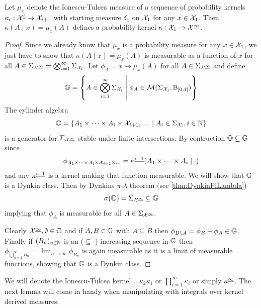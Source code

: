 \begin{prop}
  Let $\mu_x$ denote the Ionescu-Tulcea measure of a
  sequence of probability kernels
  $\kappa_i : \mathcal{X}^{\underline{i}} \to \mathcal{X}_{i+1}$
  with starting measure $\delta_x$ on $\mathcal{X}_1$ for any $x \in \mathcal{X}_1$.
  Then $\kappa(A \mid x) = \mu_x(A)$ defines a probability kernel
  $\kappa : \mathcal{X}_1 \to \mathcal{X}^{\underline{\infty}}$.
\end{prop}
\begin{proof}
  Since we already know that $\mu_x$ is a probability measure for any
  $x \in \mathcal{X}_1$,
  we just have to show that $\kappa(A \mid x) = \mu_x(A)$ is measurable
  as a function of $x$ for all
  $A \in \Sigma_{\mathcal{X}^{\underline{\infty}}}
  = \bigotimes_{i=1}^\infty \Sigma_{\mathcal{X}_i}$.
  Let $\phi_A = x \mapsto \mu_x(A)$
  for all $A \in \Sigma_\mathcal{X^{\underline{\infty}}}$ and define
  \[ \mathbb{G} = \left\{ A \in \bigotimes_{i=1}^\infty \Sigma_{\mathcal{X}_i}
  \;\middle\vert\; \phi_A \in \mathcal{M}(\Sigma_{\mathcal{X}_1}, \mathbb{B}_{[0,1]}) \right\} \]
  The cylinder algebra
  \[ \mathbb{O} = \left\{ A_1 \times \dots \times A_i \times \mathcal{X}_{i+1},
  \dots \;\middle\vert\; A_i \in \Sigma_{\mathcal{X}_i}, i \in \mathbb{N} \right\} \]
  is a generator for $\Sigma_{\mathcal{X}^{\underline{\infty}}}$ stable under 
  finite intersections.
  By contruction $\mathbb{O} \subseteq \mathbb{G}$ since
  \[ \phi_{A_1 \times \dots \times A_i \times \mathcal{X}_{i+1} \times \dots}
  = \kappa^{\underline{i-1}}(A_1 \times \dots \times A_i \mid \cdot) \]
  and any $\kappa^{\underline{i-1}}$ is a kernel making that function measurable.
  We will show that $\mathbb{G}$ is a Dynkin class.
  Then by Dynkins $\pi$-$\lambda$ theorem (see \cref{thm:DynkinPiLambda})
  \[ \sigma(\mathbb{O}) = \Sigma_{\mathcal{X}^{\underline{\infty}}}
  \subseteq \mathbb{G} \]
  implying that $\phi_A$ is measurable
  for all $A \in \Sigma_{\mathcal{X}^{\underline{\infty}}}$.
  
  Clearly $\mathcal{X}^{\underline{\infty}}, \emptyset \in \mathbb{G}$ and if
  $A,B \in \mathbb{G}$ with $A \subseteq B$ then
  $\phi_{B \setminus A} = \phi_B - \phi_A \in \mathbb{G}$.
  Finally if $(B_n)_{n \in \mathbb{N}}$ is an ($\subseteq$-) increasing sequence
  in $\mathbb{G}$ then $\phi_{\bigcup_{n=1}^\infty B_n} =
  \lim_{n \to \infty} \phi_{B_n}$ is again measurable as it is a
  limit of measurable functions, showing that $\mathbb{G}$ is a Dynkin class.
\end{proof}

We will denote the Ionescu-Tulcea kernel $\dots \kappa_2 \kappa_1$ or
$\prod_{i=1}^\infty \kappa_i$ or simply $\kappa^{\underline{\infty}}$.
The next lemma will come in handy when manipulating with integrals over
kernel derived measures.


